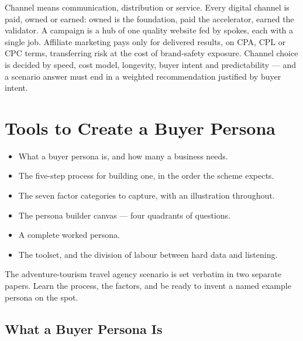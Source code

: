 \documentclass{MMTextbook}
\begin{document}
\begin{summarybox}
Channel means communication, distribution or service. Every digital channel is
paid, owned or earned: owned is the foundation, paid the accelerator, earned the
validator. A campaign is a hub of one quality website fed by spokes, each with a
single job. Affiliate marketing pays only for delivered results, on CPA, CPL or
CPC terms, transferring risk at the cost of brand-safety exposure. Channel
choice is decided by speed, cost model, longevity, buyer intent and
predictability --- and a scenario answer must end in a weighted recommendation
justified by buyer intent.
\end{summarybox}

\chapter{Tools to Create a Buyer Persona}


\begin{learningoutcomes}
\begin{itemize}
\item What a buyer persona is, and how many a business needs.
\item The five-step process for building one, in the order the scheme expects.
\item The seven factor categories to capture, with an illustration throughout.
\item The persona builder canvas --- four quadrants of questions.
\item A complete worked persona.
\item The toolset, and the division of labour between hard data and listening.
\end{itemize}
\end{learningoutcomes}

\begin{keybox}
The adventure-tourism travel agency scenario is set verbatim in two separate
papers. Learn the process, the factors, and be ready to invent a named
example persona on the spot.
\end{keybox}

\section{What a Buyer Persona Is}
\end{document}
